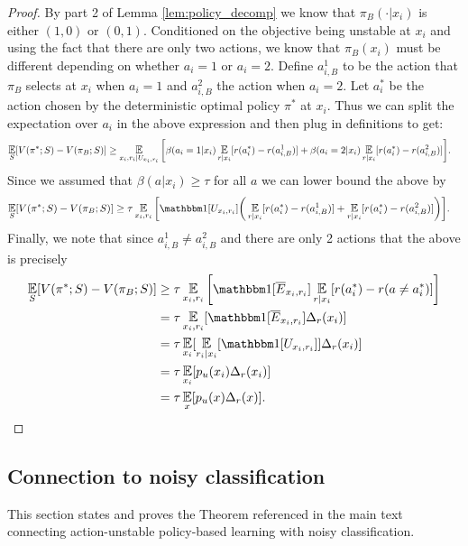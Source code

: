 \begin{subappendices}
\begin{proof}
By part 2 of Lemma \ref{lem:policy_decomp} we know that $ \pi_B(\cdot|x_i) $ is either $ (1,0)$ or $ (0,1)$. Conditioned on the objective being unstable at $ x_i$ and using the fact that there are only two actions, we know that $ \pi_B(x_i)$ must be different depending on whether $ a_i = 1$ or $ a_i = 2$. Define $ a_{i,B}^1$ to be the action that $ \pi_B$ selects at $ x_i $ when $ a_i = 1$ and $ a_{i,B}^2$ the action when $ a_i = 2$.
Let $ a_i^*$ be the action chosen by the deterministic optimal policy $ \pi^*$ at $ x_i$.
Thus we can split the expectation over $ a_i$ in the above expression and then plug in definitions to get:
\begin{align*}
    \E_{S}[V(\pi^*;S) - V(\pi_B;S)] &\geq \E_{x_i, r_i |U_{x_i, r_i}} \bigg[\beta(a_i = 1|x_i) \E_{r|x_i}[r(a^*_i) - r(a_{i,B}^1)] + \beta(a_i = 2|x_i) \E_{r|x_i}[r(a^*_i) - r(a_{i,B}^2)]\bigg].
\end{align*}
Since we assumed that $ \beta (a|x_i) \geq \tau$ for all $ a$ we can lower bound the above by
\begin{align*}
    \E_{S}[V(\pi^*;S) - V(\pi_B;S)] &\geq \tau \E_{x_i, r_i} \bigg[\one[U_{x_i, r_i}]\bigg( \E_{r|x_i}[r(a_i^*) - r(a_{i,B}^1)] +  \E_{r|x_i}[r(a_i^*) - r(a_{i,B}^2)]\bigg)\bigg].
\end{align*}
Finally, we note that since $ a_{i,B}^1 \neq a_{i,B}^2$ and there are only 2 actions that the above is precisely
\begin{align*}
    \E_{S}[V(\pi^*;S) - V(\pi_B;S)] &\geq  \tau \E_{x_i, r_i} \bigg[\one[\overline E_{x_i, r_i}] \E_{r|x_i}[r(a_i^*) - r(a \neq a^*_i)]\bigg]\\
    &= \tau \E_{x_i, r_i} [\one[\overline E_{x_i, r_i}] \Delta_r(x_i)]\\
    &= \tau \E_{x_i} [\E_{r_i|x_i}[\one[U_{x_i, r_i}]] \Delta_r(x_i)]\\
    &= \tau \E_{x_i} [p_u(x_i) \Delta_r(x_i)]\\
    &= \tau \E_{x} [p_u(x) \Delta_r(x)].
\end{align*}
\end{proof}



\subsection{Connection to noisy classification}\label{app:noisy}

This section states and proves the Theorem referenced in the main text connecting action-unstable policy-based learning with noisy classification.


\end{subappendices}
